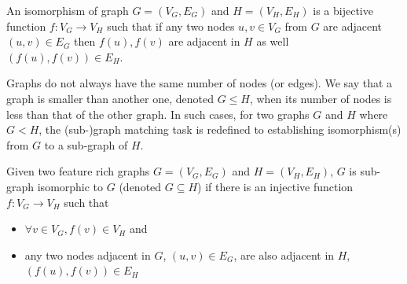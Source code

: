 \begin{definition}\label{def:gisomorphism}
    An isomorphism of graph $G=(V_G,E_G)$ and $H=(V_H,E_H)$ is a bijective function $f:V_G \rightarrow V_H$ such that if any two nodes  $u,v \in V_G$ from $G$ are adjacent $(u,v) \in E_G$ then $f(u), f(v)$ are adjacent in $H$ as well $(f(u), f(v)) \in E_H $.
\end{definition}


Graphs do not always have the same number of nodes (or edges). We say that a graph is smaller than another one, denoted $G \leq H$, when its number of nodes is less than that of the other graph. In such cases, for two graphs $G$ and $H$ where $G<H$, the (sub-)graph matching task is redefined to establishing isomorphism(s) from $G$ to a sub-graph of $H$. 

\begin{definition}\label{def:sgisomorphism}
       Given two feature rich graphs $G=(V_G,E_G)$ and $H=(V_H,E_H)$, $G$ is sub-graph isomorphic to $G$ (denoted $G \subseteq H$) if there is an injective function $f:V_G \rightarrow V_H$ such that
   \begin{itemize}
       \item $\forall v \in V_G, f(v) \in V_H$ and
       \item any two nodes adjacent in $G$, $(u,v) \in E_G$, are also adjacent in $H$, $(f(u), f(v)) \in E_H $
   \end{itemize}
\end{definition}


